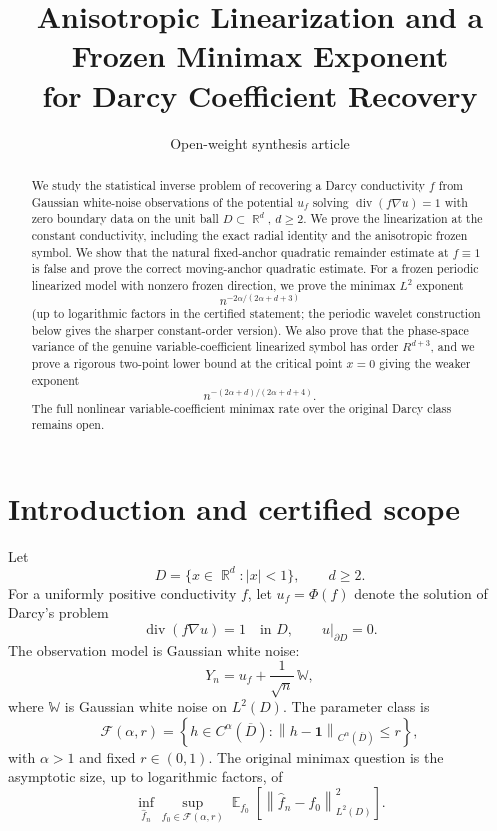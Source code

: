 \documentclass[12pt]{article}
\title{Anisotropic Linearization and a Frozen Minimax Exponent\\
for Darcy Coefficient Recovery}
\author{Open-weight synthesis article}
\date{}
\theoremstyle{remark}
\DeclareMathOperator{\E}{\mathbb E}
\DeclareMathOperator{\R}{\mathbb R}
\DeclareMathOperator{\divg}{div}
\newcommand{\one}{\mathbf 1}
\newcommand{\norm}[1]{\left\lVert #1\right\rVert}
\begin{document}
\maketitle

\begin{abstract}
We study the statistical inverse problem of recovering a Darcy conductivity \(f\) from Gaussian white-noise observations of the potential \(u_f\) solving \(\divg(f\nabla u)=1\) with zero boundary data on the unit ball \(D\subset \R^d\), \(d\ge 2\). We prove the linearization at the constant conductivity, including the exact radial identity and the anisotropic frozen symbol. We show that the natural fixed-anchor quadratic remainder estimate at \(f\equiv 1\) is false and prove the correct moving-anchor quadratic estimate. For a frozen periodic linearized model with nonzero frozen direction, we prove the minimax \(L^2\) exponent
\[
n^{-2\alpha/(2\alpha+d+3)}
\]
(up to logarithmic factors in the certified statement; the periodic wavelet construction below gives the sharper constant-order version). We also prove that the phase-space variance of the genuine variable-coefficient linearized symbol has order \(R^{d+3}\), and we prove a rigorous two-point lower bound at the critical point \(x=0\) giving the weaker exponent
\[
n^{-(2\alpha+d)/(2\alpha+d+4)}.
\]
The full nonlinear variable-coefficient minimax rate over the original Darcy class remains open.
\end{abstract}

\section{Introduction and certified scope}
\label{sec:intro}

Let
\[
D=\{x\in \R^d: |x|<1\},\qquad d\ge 2.
\]
For a uniformly positive conductivity \(f\), let \(u_f=\Phi(f)\) denote the solution of Darcy's problem
\begin{equation}
\label{eq:darcy}
\divg(f\nabla u)=1 \quad \text{in }D,\qquad u|_{\partial D}=0.
\end{equation}
The observation model is Gaussian white noise:
\[
Y_n = u_f + \frac1{\sqrt n}\,\mathbb W,
\]
where \(\mathbb W\) is Gaussian white noise on \(L^2(D)\). The parameter class is
\[
\mathcal F(\alpha,r)
=
\left\{
h\in C^\alpha(\overline D): \norm{h-\one}_{C^\alpha(\overline D)}\le r
\right\},
\]
with \(\alpha>1\) and fixed \(r\in(0,1)\). The original minimax question is the asymptotic size, up to logarithmic factors, of
\[
\inf_{\widehat f_n}\sup_{f_0\in\mathcal F(\alpha,r)}
\E_{f_0}\left[
\norm{\widehat f_n-f_0}_{L^2(D)}^2
\right].
\]
\end{document}
